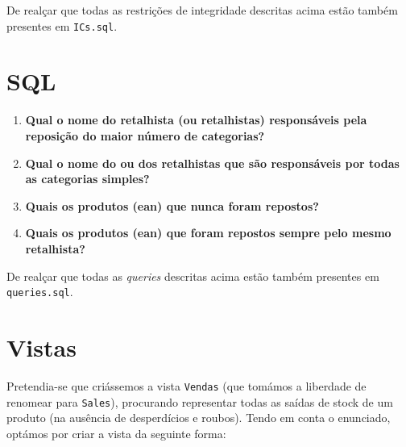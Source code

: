 \documentclass[12pt,a4paper]{article}
\begin{document}
  De realçar que todas as restrições de integridade descritas acima estão também
  presentes em \texttt{ICs.sql}.
  
  \section*{SQL}

  \begin{enumerate}
    \item \textbf{Qual o nome do retalhista (ou retalhistas) responsáveis pela reposição do maior número de categorias?}

    

    \item \textbf{Qual o nome do ou dos retalhistas que são responsáveis por todas as categorias simples?}

    

    \vspace*{2cm}

    \item \textbf{Quais os produtos (ean) que nunca foram repostos?}

    

    \item \textbf{Quais os produtos (ean) que foram repostos sempre pelo mesmo retalhista?}

    
  \end{enumerate}

  De realçar que todas as \textit{queries} descritas acima estão também
  presentes em \texttt{queries.sql}.

  \section*{Vistas}


  Pretendia-se que criássemos a vista \texttt{Vendas} (que tomámos a liberdade de renomear
  para \texttt{Sales}), procurando representar todas as saídas de stock de um produto
  (na ausência de desperdícios e roubos). Tendo em conta o enunciado, optámos por criar
  a vista da seguinte forma:
\end{document}
